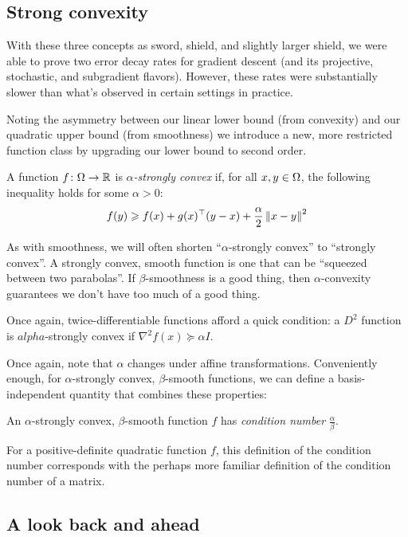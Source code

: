 \subsection{Strong convexity}

With these three concepts as sword,
shield, and slightly larger shield,
we were able to prove two error decay rates for gradient descent
(and its projective, stochastic, and subgradient flavors).
However, these rates were substantially slower than
what's observed in certain settings in practice.

Noting the asymmetry between our linear lower bound
(from convexity)
and our quadratic upper bound
(from smoothness)
we introduce a new, more restricted function class
by upgrading our lower bound to second order.

\begin{definition}
A function $f\colon\Omega\to\mathbb{R}$
is \emph{$\alpha$-strongly convex}
if, for all $x,y\in\Omega$,
the following inequality holds
for some $\alpha>0$:
\[
f(y) \geqslant f(x) + g(x)^\top(y-x) + \frac{\alpha}{2}\left\lVert x-y\right\rVert^2
\]
\end{definition}

As with smoothness,
we will often shorten ``$\alpha$-strongly convex''
to ``strongly convex''.
A strongly convex, smooth function is one that can be
``squeezed between two parabolas''.
If $\beta$-smoothness is a good thing,
then $\alpha$-convexity guarantees
we don't have too much of a good thing.

Once again,
twice-differentiable functions afford
a quick condition:
a $D^2$ function is $alpha$-strongly convex
if $\nabla^2f(x) \succeq \alpha I$.

Once again, note that $\alpha$ changes
under affine transformations.
Conveniently enough,
for $\alpha$-strongly convex, $\beta$-smooth
functions,
we can define a basis-independent 
quantity that combines these properties:

\begin{definition}
An $\alpha$-strongly convex,
$\beta$-smooth function $f$
has \emph{condition number} $\frac{\alpha}{\beta}$.
\end{definition}

For a positive-definite quadratic function $f$,
this definition of the condition number
corresponds with the perhaps more familiar
definition of the condition number of a matrix.

\subsection{A look back and ahead}

